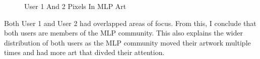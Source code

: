 \begin{figure}[H]
{\begin{minipage}{0.25\textwidth}
        \end{minipage}
    }
    \quad
    \caption{User 1 And 2 Pixels In MLP Art}
\end{figure}

Both User 1 and User 2 had overlapped areas of focus. From this, I conclude that both users are members of the MLP community. This also explains the wider distribution of both users as the MLP community moved their artwork multiple times and had more art that divded their attention. 